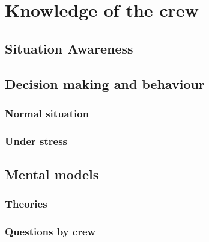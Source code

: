 \section{Knowledge of the crew}

\subsection{Situation Awareness}

\subsection{Decision making and behaviour}

\subsubsection{Normal situation}

\subsubsection{Under stress}

\subsection{Mental models}

\subsubsection{Theories}

\subsubsection{Questions by crew}